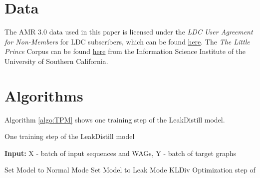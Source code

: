 \documentclass[11pt]{article}
\begin{document}
\section{Data}\label{appendix:data}
The AMR 3.0 \cite{amr-annotation-3.0} data used in this paper is licensed under the \textit{LDC User Agreement for Non-Members} for LDC subscribers, which can be found \href{https://catalog.ldc.upenn.edu/LDC2020T02}{here}. The \textit{The Little Prince} Corpus can be found \href{https://amr.isi.edu/download.html}{here} from the Information Science Institute of the University of Southern California.


\section{Algorithms}\label{apendix:algorithms}

Algorithm \ref{algo:TPM} shows one training step of the LeakDistill model.

\begin{algorithm}
\caption{One training step of the LeakDistill model}
    \begin{algorithmic}
     \State \textbf{Input:} X - batch of input sequences and WAGs, Y - batch of target graphs
     
      \State Set Model to Normal Mode
     \State  
     \State Set Model to Leak Mode
     \State 
     \State  KLDiv 
     \State 
     \State Optimization step of  
\end{algorithmic} 
 \label{algo:TPM}
\end{algorithm} 
\end{document}
